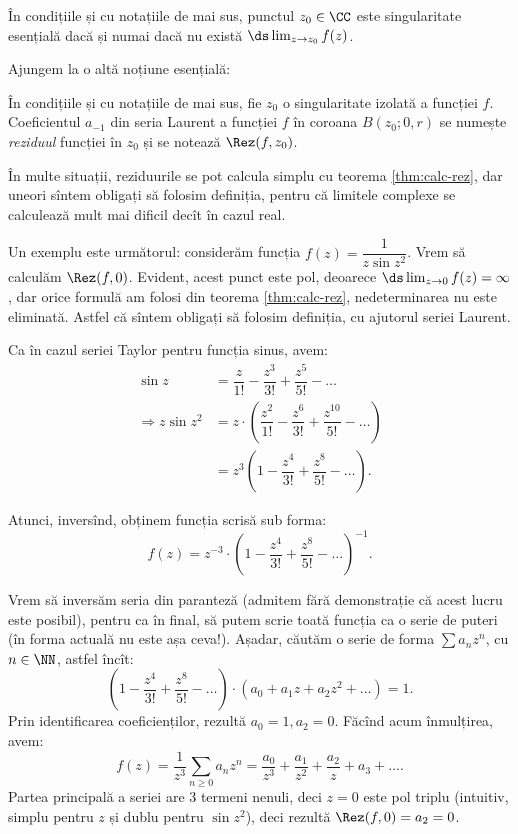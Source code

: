 \begin{proposition}\label{pr:sing-es}
  În condițiile și cu notațiile de mai sus, punctul $ z_0 \in \CC $ este
  singularitate esențială dacă și numai dacă nu există
  $ \ds\lim_{z \to z_0} f(z) $.
\end{proposition}

Ajungem la o altă noțiune esențială:
\begin{definition}\label{def:rez}
  În condițiile și cu notațiile de mai sus, fie $ z_0 $ o singularitate
  izolată a funcției $ f $. Coeficientul $ a_{-1} $ din seria Laurent
  a funcției $ f $ în coroana $ B(z_0; 0, r) $ se numește
  \emph{reziduul} funcției în $ z_0 $ și se notează $ \Rez(f,z_0) $.
\end{definition}

\begin{remark}\label{rk:calcul-rez}
  În multe situații, reziduurile se pot calcula simplu cu teorema \ref{thm:calc-rez},
  dar uneori sîntem obligați să folosim definiția, pentru că limitele complexe
  se calculează mult mai dificil decît în cazul real.
\end{remark}

Un exemplu este următorul: considerăm funcția $ f(z) = \dfrac{1}{z \sin z^2} $.
Vrem să calculăm $ \Rez(f, 0) $. Evident, acest punct este pol, deoarece
$ \ds\lim_{z \to 0} f(z) = \infty $, dar orice formulă am folosi din
teorema \ref{thm:calc-rez}, nedeterminarea nu este eliminată. Astfel că sîntem
obligați să folosim definiția, cu ajutorul seriei Laurent.

Ca în cazul seriei Taylor pentru funcția sinus, avem:
\begin{align*}
  \sin z &= \dfrac{z}{1!} - \dfrac{z^3}{3!} + \dfrac{z^5}{5!} - \dots \\
  \Rightarrow z \sin z^2 &= z \cdot \left( \dfrac{z^2}{1!} - \dfrac{z^6}{3!} + \dfrac{z^{10}}{5!} - \dots \right) \\
         &= z^3 \left( 1 - \dfrac{z^4}{3!} + \dfrac{z^8}{5!} - \dots \right).
\end{align*}

Atunci, inversînd, obținem funcția scrisă sub forma:
\[
  f(z) = z^{-3} \cdot \left( 1 - \dfrac{z^4}{3!} + \dfrac{z^8}{5!} - \dots \right)^{-1}.
\]

Vrem să inversăm seria din paranteză (admitem fără demonstrație că acest lucru
este posibil), pentru ca în final, să putem scrie toată funcția ca o serie de
puteri (în forma actuală nu este așa ceva!). Așadar, căutăm o serie de forma
$ \sum a_n z^n $, cu $ n \in \NN $, astfel încît:
\[
  \left( 1 - \dfrac{z^4}{3!} + \dfrac{z^8}{5!} - \dots \right) \cdot %
  \left(a_0 + a_1 z + a_2 z^2 + \dots \right) = 1.
\]
Prin identificarea coeficienților, rezultă $ a_0 = 1, a_2 = 0 $. Făcînd acum
înmulțirea, avem:
\[
  f(z) = \dfrac{1}{z^3} \sum_{n \geq 0} a_n z^n = %
  \dfrac{a_0}{z^3} + \dfrac{a_1}{z^2} + \dfrac{a_2}{z} + a_3 + \dots.
\]
Partea principală a seriei are 3 termeni nenuli, deci $ z = 0 $ este pol triplu
(intuitiv, simplu pentru $ z $ și dublu pentru $ \sin z^2 $), deci rezultă
$ \Rez(f, 0) = a_2 = 0 $.

